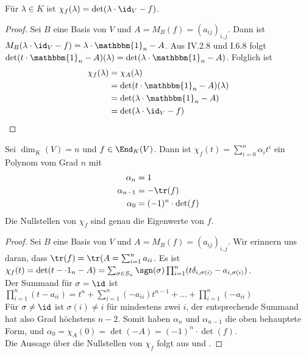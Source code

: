 \begin{lemma}
	Für $\lambda\in K$ ist $\chi_f(\lambda)=\det(\lambda\cdot\id_V-f)$.
\end{lemma}
\begin{proof}
	Sei $B$ eine Basis von $V$ und $A=M_B(f)=(a_{ij})_{i,j}$. Dann ist $M_B(\lambda\cdot\id_V-f)= \lambda\cdot \mathbbm{1}_n-A$. Aus IV.2.8 und I.6.8 folgt $\det(t\cdot \mathbbm{1}_n-A)(\lambda)=\det(\lambda\cdot \mathbbm{1}_n-A)$. Folglich ist 
	\begin{align}
		\chi_f(\lambda)&=\chi_A(\lambda)\notag \\
		&=\det(t\cdot \mathbbm{1}_n-A)(\lambda)\notag \\
		&=\det(\lambda\cdot \mathbbm{1}_n-A)\notag \\
		&= \det(\lambda\cdot\id_V-f) \notag
	\end{align}
\end{proof}

\begin{proposition}
	Sei $\dim_K(V)=n$ und $f\in\End_K(V)$. Dann ist $\chi_f(t)=\sum_{i=0}^n \alpha_i t^i$ ein Polynom vom Grad $n$ mit 
	\begin{align}
		\alpha_n&=1\notag \\
		\alpha_{n-1}&=-\tr(f) \notag \\
		\alpha_0 &= (-1)^n\cdot\det(f) \notag
	\end{align}
	Die Nullstellen von $\chi_f$ sind genau die Eigenwerte von $f$.
\end{proposition}
\begin{proof}
	Sei $B$ eine Basis von $V$ und $A=M_B(f)=(a_{ij})_{i,j}$. Wir erinnern uns daran, dass $\tr(f)=\tr(A=\sum_{i=1}^n a_{ii}$. Es ist $\chi_f(t)=\det(t-\cdot 1_n-A)=\sum_{\sigma\in S_n}\sgn(\sigma)\prod_{i=1}^n (t\delta_{i,\sigma(i)}-a_{i,\sigma(i)})$. \\
	Der Summand für \emph{$\sigma=\id$} ist $\prod_{i=1}^n (t-a_{ii})=t^n+\sum_{i=1}^n (-a_{ii})t^{n-1}+...+\prod_{i=1}^n(-a_{ii})$ \\
	Für \emph{$\sigma\neq\id$} ist $\sigma(i)\neq i$ für mindestens zwei $i$, der entsprechende Summand hat also Grad höchstens $n-2$. Somit haben $\alpha_n$ und $\alpha_{n-1}$ die oben behauptete Form, und $\alpha_0=\chi_A(0)=\det(-A)=(-1)^n\cdot\det(f)$. \\
	Die Aussage über die Nullstellen von $\chi_f$ folgt aus  und .
\end{proof}

